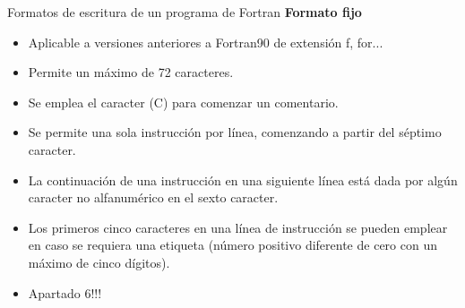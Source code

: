 \begin{frame}[fragile]{Formatos de escritura de un programa de Fortran}
 \textbf{Formato fijo}
  \begin{itemize}[<+(1)->]
   \item Aplicable a versiones anteriores a Fortran90 de extensión f, for...
   \item Permite un máximo de 72 caracteres.
   \item Se emplea el caracter (C) para comenzar un comentario. 
   \item Se permite una sola instrucción por línea, comenzando a partir del séptimo caracter.
   \item La continuación de una instrucción en una siguiente línea está dada por algún caracter no alfanumérico en el sexto caracter. 
   \item Los primeros cinco caracteres en una línea de instrucción se pueden emplear en caso se requiera una etiqueta (número positivo diferente de cero con un máximo de cinco dígitos).
   \item Apartado 6!!!
  \end{itemize}
\end{frame}

